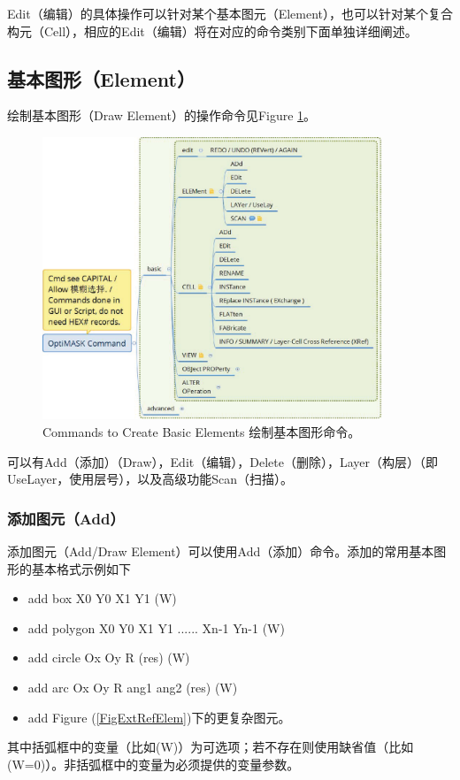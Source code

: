 Edit（编辑）的具体操作可以针对某个基本图元（Element），也可以针对某个复合构元（Cell），相应的Edit（编辑）将在对应的命令类别下面单独详细阐述。

\subsection{基本图形（Element）} \label{SectCmdDraw}
绘制基本图形（Draw Element）的操作命令见Figure \ref{FigCmdElem}。
\begin{figure}[htb!p] %
	\centering
	\includegraphics[width=4in]{./Layout/FigsCmd/CmdBasicElement.eps}
	\caption{Commands to Create Basic Elements 绘制基本图形命令。}
	\label{FigCmdElem}
\end{figure}
可以有Add（添加）（Draw），Edit（编辑），Delete（删除），Layer（构层）（即UseLayer，使用层号），以及高级功能Scan（扫描）。

\subsubsection{添加图元（Add）} \label{SectCmdAdd}
添加图元（Add/Draw Element）可以使用Add（添加）命令。添加的常用基本图形的基本格式示例如下
\begin{itemize}
	\item add box X0 Y0 X1 Y1 (W)
	\item add polygon X0 Y0 X1 Y1 ...... Xn-1 Yn-1 (W)
	\item add circle Ox Oy R (res) (W)
	\item add arc Ox Oy R ang1 ang2 (res) (W) 
	\item add Figure (\ref{FigExtRefElem})下的更复杂图元。
\end{itemize}
其中括弧框中的变量（比如(W)）为可选项；若不存在则使用缺省值（比如(W=0)）。非括弧框中的变量为必须提供的变量参数。


